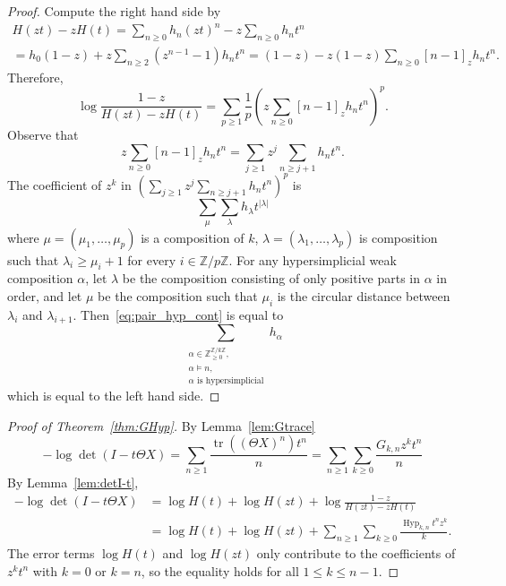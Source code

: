 \documentclass[12pt,reqno]{amsart}
\theoremstyle{plain}
\theoremstyle{definition}
\newcommand{\Z}{\mathbb{Z}}
\DeclareMathOperator{\Hyp}{Hyp}
\DeclareMathOperator{\tr}{tr}
\begin{document}
\begin{proof}
	Compute the right hand side by
	\begin{multline}
		H(zt) - z H(t) = \sum_{n \geq 0} h_n (zt)^n - z \sum_{n \geq 0} h_n t^n \\ = h_0(1-z) + z \sum_{n \geq 2} (z^{n-1} - 1) h_n t^n = (1-z) - z(1-z) \sum_{n \geq 0} [n-1]_z h_n t^n.
	\end{multline}
	Therefore,
	\begin{equation}
		\log \frac{1-z}{H(zt) - z H(t)} = \sum_{p \geq 1} \frac{1}{p} \left(z \sum_{n \geq 0} [n-1]_z h_n t^n \right)^p.
	\end{equation}
	Observe that
	\begin{equation}
		z \sum_{n \geq 0} [n-1]_z h_n t^n = \sum_{j \geq 1} z^j \sum_{n \geq j+1} h_n t^n.
	\end{equation}
	The coefficient of $ z^k $ in $
		\left(\sum_{j \geq 1} z^j \sum_{n \geq j+1} h_n t^n \right)^p $ is
	\begin{equation}\label{eq:pair_hyp_cont}
		\sum_{\mu} \sum_\lambda h_\lambda t^{|\lambda|}
	\end{equation}
	where $ \mu = (\mu_1,\dots,\mu_p) $ is a composition of $ k $, $ \lambda = (\lambda_1,\dots,\lambda_p)$
	is composition such that $
		\lambda_i \geq \mu_i + 1 $ for every $ i \in \Z/p\Z $. For any hypersimplicial weak composition $\alpha$, let $\lambda$ be the composition consisting of only positive parts in $\alpha$ in order, and let $\mu$ be the composition such that $\mu_i$ is the circular distance between $\lambda_i$ and $\lambda_{i+1}$.
	Then~\eqref{eq:pair_hyp_cont} is equal to
	\[
		\sum_{\substack{\alpha \in \Z_{\geq0}^{\Z/k\Z}, \\ \alpha \models n, \\ \alpha \text{ is hypersimplicial}}} h_\alpha
	\]
	which is equal to the left hand side.
\end{proof}

\begin{proof}[Proof of Theorem~\ref{thm:GHyp}]
	By Lemma~\ref{lem:Gtrace}
	\begin{equation}
		-\log \det(I - t\Theta X) = \sum_{n \geq 1} \frac{\tr((\Theta X)^n)t^n}{n} = \sum_{n \geq 1} \sum_{k \geq 0} \frac{G_{k,n} z^k t^n}{n}
	\end{equation}
	By Lemma~\ref{lem:detI-t},
	\begin{align}
		-\log \det(I - t\Theta X) & = \log H(t) + \log H(zt) + \log \frac{1-z}{H(zt) - zH(t)} \\
		                          & = \log H(t) + \log H(zt) + \sum_{n \geq 1} \sum_{k \geq 0} \frac{\Hyp_{k,n} t^n z^k}{k}.
	\end{align}
	The error terms $\log H(t)$ and $\log H(zt)$ only contribute to the coefficients of $z^k t^n$ with $k=0$ or $k=n$, so the equality holds for all $1 \leq k \leq n-1$.
\end{proof}
\end{document}
